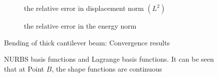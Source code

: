     \begin{figure}
        \begin{subfigure}[b]{1\linewidth}
            \centering
            \scalebox{0.7}{
                
            }
            \label{fig:circular_hole_displacement_convergence}
            \caption{the relative error in displacement norm $(L^2)$}
        \end{subfigure}
        
        \begin{subfigure}[b]{1\linewidth}
            \centering
            \scalebox{0.7}{
                
            }
            \label{fig:circular_hole_energy_convergence}
            \caption{the relative error in the energy norm}
        \end{subfigure}
    \caption{Bending of thick cantilever beam: Convergence results}
    \label{fig:circular_hole_convergence}
    \end{figure}

    \begin{figure}
        \centering
        \caption{NURBS basis functions and Lagrange basis functions. It can be seen that at Point $B$, the shape functions are continuous}
        \label{fig:circular_hole_basis}
    \end{figure}

